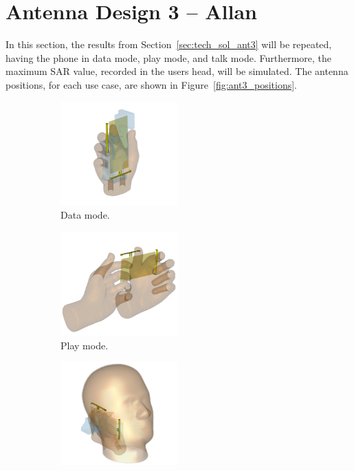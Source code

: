 \section{Antenna Design 3 -- Allan}
In this section, the results from Section~\ref{sec:tech_sol_ant3} will be repeated, having the phone in data mode, play mode, and talk mode. Furthermore, the maximum SAR value, recorded in the users head, will be simulated. The antenna positions, for each use case, are shown in Figure~\ref{fig:ant3_positions}.

\begin{figure}[htbp]
    \centering
    \begin{subfigure}[b]{0.24\linewidth}
        \centering
        \includegraphics[width=\linewidth,height=4cm,keepaspectratio]{img/tech_sol/nonresonant/simulation/data_mode/3d}
        \caption{Data mode.}
    \end{subfigure}
    \begin{subfigure}[b]{0.24\linewidth}
        \centering
        \includegraphics[width=\linewidth,height=4cm,keepaspectratio]{img/tech_sol/nonresonant/simulation/play_mode/3d}
        \caption{Play mode.}
    \end{subfigure}
    \begin{subfigure}[b]{0.24\linewidth}
        \centering
        \includegraphics[width=\linewidth,height=4cm,keepaspectratio]{img/tech_sol/nonresonant/simulation/talk_mode/3d}

\end{subfigure}
\end{figure}
